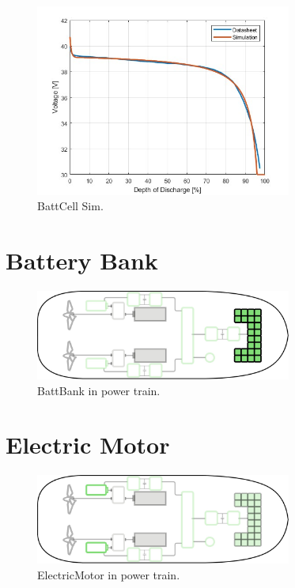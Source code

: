 \begin{figure}[h]
    \centering
    \includegraphics[width=0.75\textwidth]{images/chapter05/BattCellSim_jpg.jpg}
    \caption{BattCell Sim.}
    \label{fig:BattCellSim}
\end{figure}



\section{Battery Bank}

\begin{figure}[h!]
    \centering
    \includegraphics[width=0.75\textwidth]{images/chapter05/BattBank_scheme.jpg}
    \caption{BattBank in power train.}
    \label{BattBank}
\end{figure}

\section{Electric Motor}

\begin{figure}[h]
    \centering
    \includegraphics[width=0.75\textwidth]{images/chapter05/ElectricMotor_scheme.jpg}
    \caption{ElectricMotor in power train.}
    \label{ElectricMotor}
\end{figure}

